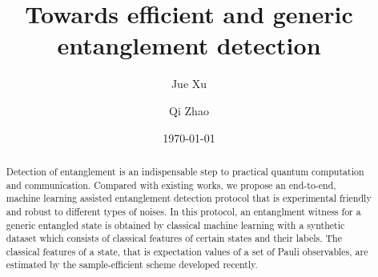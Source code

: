 \documentclass[
aps,
pra,
twocolumn,
floatfix,
]{revtex4-2}
\theoremstyle{plain}
\theoremstyle{definition}
\begin{document}
\title{Towards efficient and generic entanglement detection}
\author{Jue Xu}
\author{Qi Zhao}
\date{\today}
\begin{abstract}
	Detection of entanglement is an indispensable step to practical quantum computation and communication.
	Compared with existing works, we propose an end-to-end, machine learning assisted entanglement detection protocol that is experimental friendly and robust to different types of noises.
	In this protocol, an entanglment witness for a generic entangled state is obtained by classical machine learning with a synthetic dataset which consists of classical features of certain states and their labels. 
	The classical features of a state, that is expectation values of a set of  Pauli observables, are estimated by the sample-efficient scheme developed recently.
\end{abstract}

\maketitle

\end{document}
